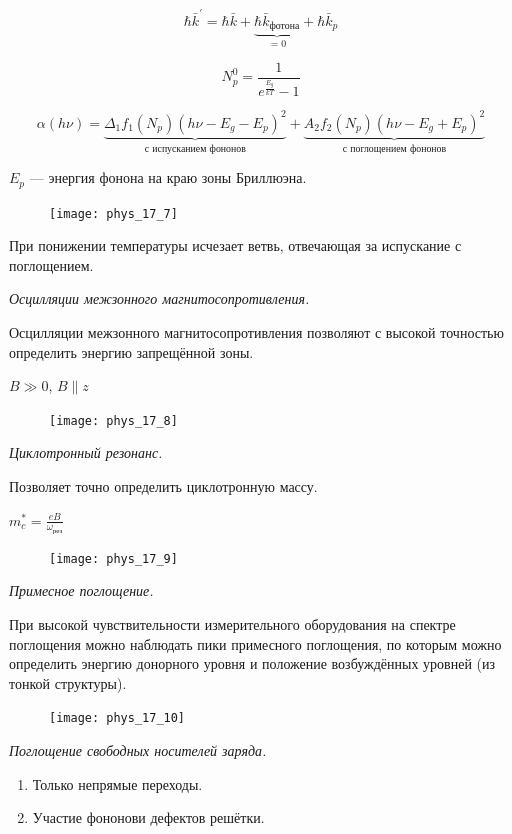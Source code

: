 $$\hbar \bar{k}^\prime = \hbar \bar{k} + \underbrace{\hbar \bar{k}_\text{фотона}}_{=0}+\hbar \bar{k}_p$$

$$N_p ^0 = \frac{1}{e^{\frac{E_g}{kT}}-1}$$


$$\alpha (h\nu) = \underbrace{\Delta_1 f_1(N_p)(h\nu - E_g - E_p)^2}_\text{с испусканием фононов} + \underbrace{A_2f_2(N_p) (h\nu - E_g + E_p)^2}_\text{с поглощением фононов}$$

$E_p$ --- энергия фонона на краю зоны Бриллюэна.

\begin{figure}[h!]
    \centering
    \texttt{[image: phys\_17\_7]}
\end{figure}

При понижении температуры исчезает ветвь, отвечающая за испускание с поглощением.

\textit{Осцилляции межзонного магнитосопротивления.}

Осцилляции межзонного магнитосопротивления позволяют с высокой точностью определить энергию запрещённой зоны.

$B \gg 0$, $B \parallel z$

\begin{figure}[h!]
    \centering
    \texttt{[image: phys\_17\_8]}
\end{figure}


\textit{Циклотронный резонанс.}

Позволяет точно определить циклотронную массу.

$m^*_c=\frac{eB}{\omega_\text{рез}}$

\begin{figure}[h!]
    \centering
    \texttt{[image: phys\_17\_9]}
\end{figure}

\textit{Примесное поглощение.}

При высокой чувствительности измерительного оборудования на спектре поглощения можно наблюдать пики примесного поглощения, по которым можно определить энергию донорного уровня и положение возбуждённых уровней (из тонкой структуры).

\begin{figure}[h!]
    \centering
    \texttt{[image: phys\_17\_10]}
\end{figure}

\textit{Поглощение свободных носителей заряда.}

\begin{enumerate}
    \item Только непрямые переходы.
    \item Участие фононови дефектов решётки.
\end{enumerate}

